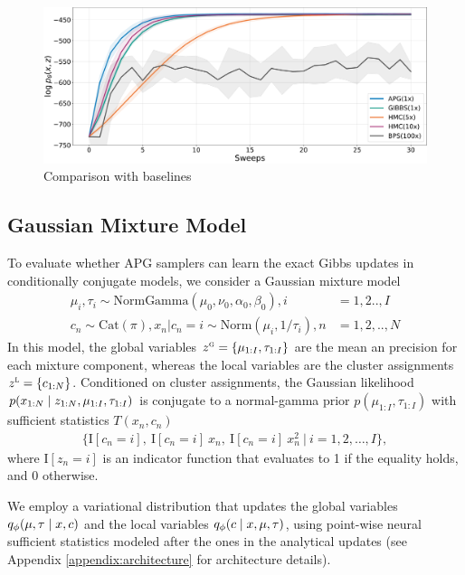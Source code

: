 \documentclass{article}
\theoremstyle{definition}
\begin{document}
\begin{figure}[t!]
\centering
\includegraphics[width=\columnwidth]{figures/convergence_gmm.pdf}
  \caption{Comparison with baselines}
  \label{fig:convergence-gmm}
\end{figure}

\subsection{Gaussian Mixture Model}
\label{sec:gmm}
\vspace{-0.5em}
To evaluate whether APG samplers can learn the exact Gibbs updates in conditionally conjugate models, we consider a Gaussian mixture model 
\begin{align*}
    \mu_i, \tau_i \sim \text{NormGamma}(\mu_0, \nu_0, \alpha_0, \beta_0)
    , i &=1,2..,I \\
    c_n \sim \mathrm{Cat}(\pi), 
    x_n | c_n\!=\!i \sim \text{Norm}(\mu_i, 1 / \tau_i)
    ,n &=1,2,..,N
\end{align*}
In this model, the global variables $z^\textsc{g} = \{\mu_{1:I}, \tau_{1:I}\}$ are the mean an precision for each mixture component, whereas the local variables are the cluster assignments $z^\textsc{l} = \{c_{1:N}\}$. Conditioned on cluster assignments, the Gaussian likelihood $p(x_{1:N} \mid z_{1:N}, \mu_{1:I}, \tau_{1:I})$ is conjugate to a normal-gamma prior $p(\mu_{1:I}, \tau_{1:I})$ with sufficient statistics $T(x_n, c_n)$ 
\begin{align*}
    \Big\{\mathrm{I}[c_n \!=\! i], 
        ~\mathrm{I}[c_n \!=\! i] \: x_n, 
        ~\mathrm{I}[c_n \!=\! i] \: x_n^2 
        ~\Big\vert~ i \!=\! 1,2,\dots,I 
    \Big\}
    ,
\end{align*}
where $\mathrm{I}[z_n \!=\! i]$ is an indicator function that evaluates to 1 if the equality holds, and 0 otherwise.

We employ a variational distribution that updates the global variables $q_\phi(\mu, \tau \mid x, c)$ and the local variables $q_\phi(c \mid x, \mu, \tau)$, using point-wise neural sufficient statistics modeled after the ones in the analytical updates (see Appendix \ref{appendix:architecture} for architecture details).
\end{document}
